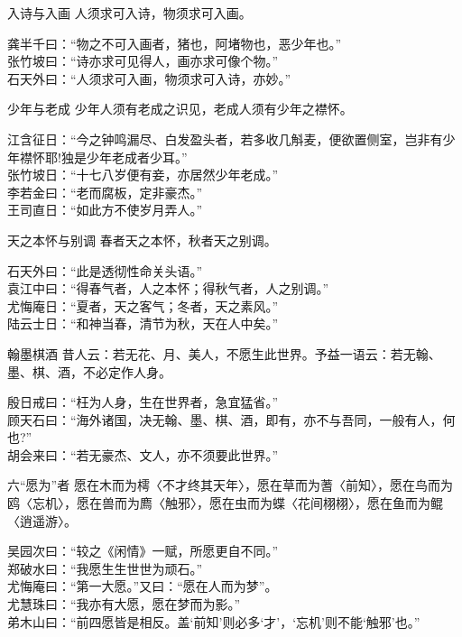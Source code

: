 \begin{yulu}{入诗与入画}
人须求可入诗，物须求可入画。
\begin{comments}
龚半千曰：“物之不可入画者，猪也，阿堵物也，恶少年也。” \\
张竹坡曰：“诗亦求可见得人，画亦求可像个物。” \\
石天外曰：“人须求可入画，物须求可入诗，亦妙。”
\end{comments}
\end{yulu}

\begin{yulu}{少年与老成}
少年人须有老成之识见，老成人须有少年之襟怀。
\begin{comments}
江含征日：“今之钟鸣漏尽、白发盈头者，若多收几斛麦，便欲置侧室，岂非有少年襟怀耶!独是少年老成者少耳。” \\
张竹坡日：“十七八岁便有妾，亦居然少年老成。” \\
李若金曰：“老而腐板，定非豪杰。” \\
王司直日：“如此方不使岁月弄人。”
\end{comments}
\end{yulu}

\begin{yulu}{天之本怀与别调}
春者天之本怀，秋者天之别调。
\begin{comments}
石天外曰：“此是透彻性命关头语。” \\
袁江中曰：“得春气者，人之本怀；得秋气者，人之别调。” \\
尤悔庵日：“夏者，天之客气；冬者，天之素风。” \\
陆云士日：“和神当春，清节为秋，天在人中矣。”
\end{comments}
\end{yulu}


\begin{yulu}{翰墨棋酒}
昔人云：若无花、月、美人，不愿生此世界。予益一语云：若无翰、墨、棋、酒，不必定作人身。
\begin{comments}
殷日戒曰：“枉为人身，生在世界者，急宜猛省。” \\
顾天石曰：“海外诸国，决无翰、墨、棋、酒，即有，亦不与吾同，一般有人，何也?” \\
胡会来曰：“若无豪杰、文人，亦不须要此世界。”
\end{comments}
\end{yulu}


\begin{yulu}{六“愿为”者}
愿在木而为樗〈不才终其天年〉，愿在草而为蓍〈前知〉，愿在鸟而为鸥〈忘机〉，愿在兽而为廌〈触邪〉，愿在虫而为蝶〈花间栩栩〉，愿在鱼而为鲲〈逍遥游〉。
\begin{comments}
吴园次曰：“较之《闲情》一赋，所愿更自不同。” \\
郑破水曰：“我愿生生世世为顽石。” \\
尤悔庵曰：“第一大愿。”又曰：“愿在人而为梦”。 \\
尤慧珠曰：“我亦有大愿，愿在梦而为影。” \\
弟木山曰：“前四愿皆是相反。盖‘前知’则必多‘才’，‘忘机’则不能‘触邪’也。”
\end{comments}
\end{yulu}

